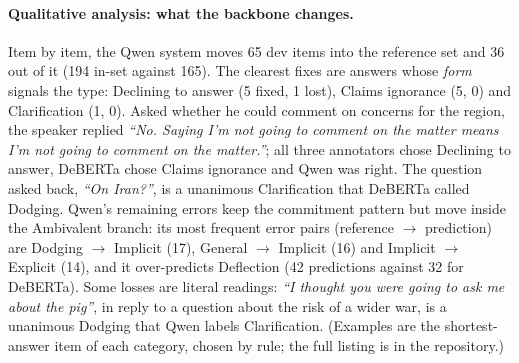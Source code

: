 \paragraph{Qualitative analysis: what the backbone changes.}
Item by item, the Qwen system moves 65 dev items into the reference set and 36 out of it (194 in-set against 165).
The clearest fixes are answers whose \emph{form} signals the type: Declining to answer (5 fixed, 1 lost), Claims ignorance (5, 0) and Clarification (1, 0).
Asked whether he could comment on concerns for the region, the speaker replied \emph{``No. Saying I'm not going to comment on the matter means I'm not going to comment on the matter.''}; all three annotators chose Declining to answer, DeBERTa chose Claims ignorance and Qwen was right.
The question asked back, \emph{``On Iran?''}, is a unanimous Clarification that DeBERTa called Dodging.
Qwen's remaining errors keep the commitment pattern but move inside the Ambivalent branch: its most frequent error pairs (reference $\rightarrow$ prediction) are Dodging $\rightarrow$ Implicit (17), General $\rightarrow$ Implicit (16) and Implicit $\rightarrow$ Explicit (14), and it over-predicts Deflection (42 predictions against 32 for DeBERTa).
Some losses are literal readings: \emph{``I thought you were going to ask me about the pig''}, in reply to a question about the risk of a wider war, is a unanimous Dodging that Qwen labels Clarification.
(Examples are the shortest-answer item of each category, chosen by rule; the full listing is in the repository.)
